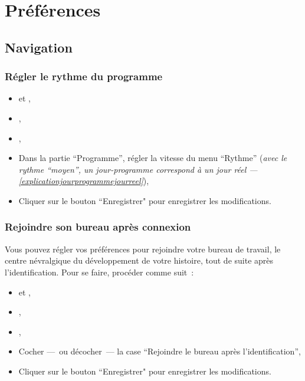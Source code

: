 \chapter{Préférences} %
\label{preferences}

\section{Navigation} %
\label{navigation}


\subsection{Régler le rythme du programme }
\label{sub:reglerlerythmeduprogramme}

\begin{itemize}
  \item \rejoindreLeSite{} et \vousIdentifier{},
  \item \rejoindreBureau{},
  \item {},
  \item Dans la partie “Programme”, régler la vitesse du menu “Rythme” ({\it avec le rythme \enquote{moyen}, un jour-programme correspond à un jour réel — \ref{explicationjourprogrammejourreel}}),
  \item Cliquer sur le bouton “Enregistrer" pour enregistrer les modifications.
\end{itemize}


\subsection{Rejoindre son bureau après connexion}
\label{rejoindresonbureauapresconnexion}

Vous pouvez régler vos préférences pour rejoindre votre bureau de travail, le centre névralgique du développement de votre histoire, tout de suite après l'identification. Pour se faire, procéder comme suit~:

\begin{itemize}
  \item \rejoindreLeSite{} et \vousIdentifier{},
  \item \rejoindreBureau{},
  \item {},
  \item Cocher —~ou décocher~— la case “Rejoindre le bureau après l'identification”,
  \item Cliquer sur le bouton “Enregistrer" pour enregistrer les modifications.
\end{itemize}

